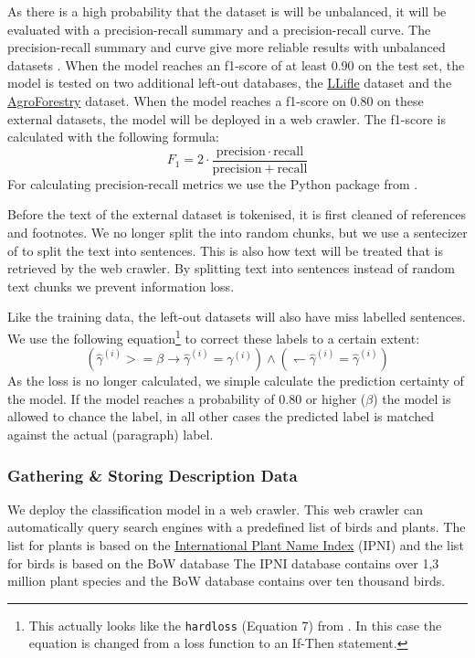 \documentclass[a4paper, 12pt, oneside]{book} %
\begin{document}
As there is a high probability that the dataset is will be unbalanced, it will be evaluated with a precision-recall summary and a precision-recall curve.
The precision-recall summary and curve give more reliable results with unbalanced datasets \autocite{saito_precision-recall_2015}.
When the model reaches an f1-score of at least 0.90 on the test set, the model is tested on two additional left-out databases, the \href{http://www.llifle.com/}{LLifle} dataset and the \href{https://www.worldagroforestry.org/}{AgroForestry} dataset.
When the model reaches a f1-score on 0.80 on these external datasets, the model will be deployed in a web crawler.
The f1-score is calculated with the following formula:
\begin{equation}
    F_1 = 2 \cdot \frac{\mathrm{precision} \cdot \mathrm{recall}}{\mathrm{precision} + \mathrm{recall}} 
\end{equation}
For calculating precision-recall metrics we use the Python package from \textcite{pedregosa_scikit-learn_2011}.

Before the text of the external dataset is tokenised, it is first cleaned of references and footnotes.
We no longer split the into random chunks, but we use a sentecizer of \textcite{honnibal_spacy_2020} to split the text into sentences.
This is also how text will be treated that is retrieved by the web crawler.
By splitting text into sentences instead of random text chunks we prevent information loss.

Like the training data, the left-out datasets will also have miss labelled sentences.
We use the following equation\footnote{This actually looks like the \texttt{hardloss} (Equation 7) from \textcite{reed_training_2015}. In this case the equation is changed from a loss function to an If-Then statement.} to correct these labels to a certain extent:
\begin{equation} \label{eq:softloss_ifthen}
(\hat{\gamma}^{(i)} >= \beta \rightarrow \hat{\gamma}^{(i)} = \gamma^{(i)}) \wedge ( \leftharpoondown \hat{\gamma}^{(i)} = \hat{\gamma}^{(i)})
\end{equation}
As the loss is no longer calculated, we simple calculate the prediction certainty of the model.
If the model reaches a probability of 0.80 or higher (\(\beta\)) the model is allowed to chance the label, in all other cases the predicted label is matched against the actual (paragraph) label.


\subsubsection{Gathering \& Storing Description Data}
We deploy the classification model in a web crawler.
This web crawler can automatically query search engines with a predefined list of birds and plants.
The list for plants is based on the \href{https://www.ipni.org/}{International Plant Name Index} (IPNI) and the list for birds is based on the BoW database %
The IPNI database contains over 1,3 million plant species and the BoW database contains over ten thousand birds.
\end{document}
